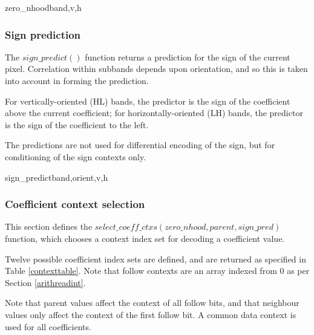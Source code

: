 \begin{pseudo}{zero\_nhood}{band,v,h}
    \bsRET{\false}
  \bsEND
      \bsRET{\false}
    \bsEND
  \bsEND
\bsELSE
      \bsRET{\false}
    \bsEND
  \bsEND
\bsEND
\bsRET{\true}
\end{pseudo}

\subsubsection{Sign prediction}
\label{signpredict}

The $sign\_predict()$ function returns a prediction for the sign of the 
current pixel. Correlation within subbands depends upon orientation,
and so this is taken into account in forming the prediction.

For vertically-oriented (HL) bands, the predictor is the sign of the
coefficient above the current coefficient; for horizontally-oriented (LH)
bands, the predictor is the sign of the coefficient to the left. 

The predictions are not used for differential encoding of the sign, but for
conditioning of the sign contexts only.

\begin{pseudo}{sign\_predict}{band,orient,v,h}
  \bsELSE
  \bsEND
{}
  \bsELSE
  \bsEND
\bsELSE
\bsEND{}
\end{pseudo}

\subsubsection{Coefficient context selection}
\label{selectcoeffcontext}

This section defines the $select\_coeff\_ctxs(zero\_nhood, parent, sign\_pred)$
function, which chooses a context index set for decoding a coefficient value.

Twelve possible coefficient index sets are defined, and are returned as specified 
in Table \ref{contexttable}. Note that follow contexts are an array indexed from $0$
as per Section \ref{arithreadint}.

Note that parent values affect the context of all follow bits, and that neighbour
values only affect the context of the first follow bit. A common data context is used
for all coefficients.

